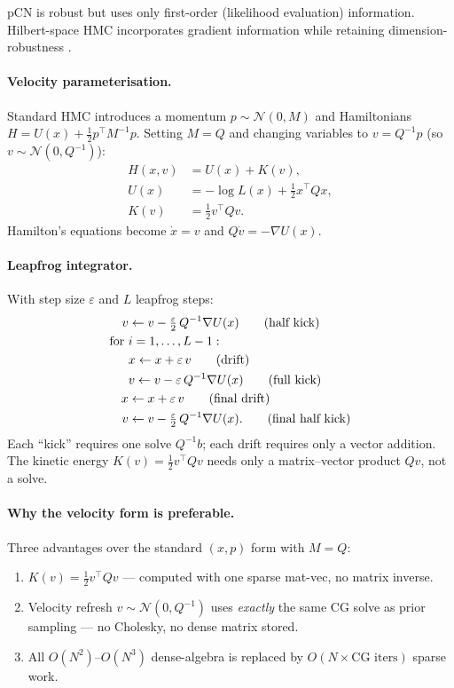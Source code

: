 \documentclass[11pt]{article}
\begin{document}
pCN is robust but uses only first-order (likelihood evaluation) information.
Hilbert-space HMC incorporates gradient information while retaining
dimension-robustness \citep{beskos2011}.

\paragraph{Velocity parameterisation.}
Standard HMC introduces a momentum $p \sim \mathcal{N}(0, M)$ and
Hamiltonians $H = U(x) + \tfrac{1}{2}p^\top M^{-1} p$.  Setting $M = Q$
and changing variables to $v = Q^{-1}p$ (so $v \sim \mathcal{N}(0, Q^{-1})$):
\begin{align}
  H(x,v) &= U(x) + K(v), \\
  U(x)   &= -\log L(x) + \tfrac{1}{2} x^\top Q x, \label{eq:hmc-U}\\
  K(v)   &= \tfrac{1}{2} v^\top Q v. \label{eq:hmc-K}
\end{align}
Hamilton's equations become $\dot{x} = v$ and $Q\dot{v} = -\nabla U(x)$.

\paragraph{Leapfrog integrator.}
With step size $\varepsilon$ and $L$ leapfrog steps:
\begin{align}
  v &\leftarrow v - \tfrac{\varepsilon}{2}\, Q^{-1}\nabla U(x) \tag{half kick}\\
  \text{for } & i = 1,\ldots, L-1: \notag\\
  & x \leftarrow x + \varepsilon\, v \tag{drift}\\
  & v \leftarrow v - \varepsilon\, Q^{-1}\nabla U(x) \tag{full kick}\\
  x &\leftarrow x + \varepsilon\, v \tag{final drift}\\
  v &\leftarrow v - \tfrac{\varepsilon}{2}\, Q^{-1}\nabla U(x). \tag{final half kick}
\end{align}
Each ``kick'' requires one solve $Q^{-1}b$; each drift requires only a
vector addition.  The kinetic energy $K(v) = \tfrac{1}{2}v^\top Qv$ needs only
a matrix–vector product $Qv$, not a solve.

\paragraph{Why the velocity form is preferable.}
Three advantages over the standard $(x, p)$ form with $M = Q$:
\begin{enumerate}
  \item $K(v) = \tfrac{1}{2}v^\top Qv$ — computed with one sparse mat-vec, no
        matrix inverse.
  \item Velocity refresh $v \sim \mathcal{N}(0, Q^{-1})$ uses \emph{exactly} the same
        CG solve as prior sampling — no Cholesky, no dense matrix stored.
  \item All $O(N^2)$--$O(N^3)$ dense-algebra is replaced by $O(N \times
        \text{CG iters})$ sparse work.
\end{enumerate}
\end{document}
